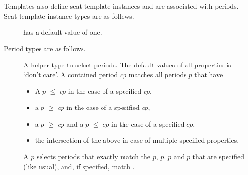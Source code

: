Templates also define seat template instances and are associated with periods.
Seat template instance types are as follows.
\begin{description}
  \item[] 

     has a default value of one.
\end{description}

Period types are as follows.
\begin{description}
  \item[] 

    
  \item[] 

    A helper type to select periods. The default values of all properties is
    ‘don’t care’.
    A contained period $cp$ matches all periods $p$ that have
    \begin{itemize}
      \item A $p$ $\leq$ $cp$ in the case of a specified
        $cp$,
      \item a $p$ $\geq$ $cp$ in the case of a specified $cp$,
      \item a $p$ $\geq$ $cp$ and a $p$ $\leq$
        $cp$ in the case of a specified $cp$,
      \item the intersection of the above in case of multiple specified
        properties.
    \end{itemize}

  \item[] 

    A  $p$ selects periods that exactly match the $p$,
    $p$, $p$ and $p$ that are specified
    (like usual), and, if specified, match .


\end{description}
